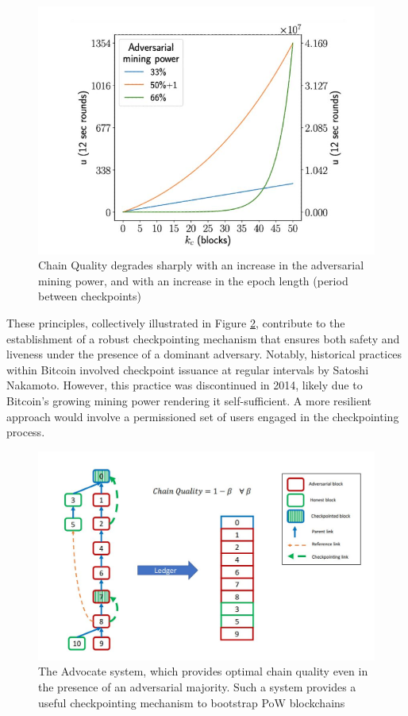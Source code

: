 \documentclass{report}
\begin{document}
\begin{figure}[h!]
	\centering
	\includegraphics[width=0.8\linewidth]{Fig/F5}
	\caption{Chain Quality degrades sharply with an increase in the adversarial mining power, and	with an increase in the epoch length (period between checkpoints)}
	\label{fig:f5}
\end{figure}
These principles, collectively illustrated in Figure \ref{fig:f6}, contribute to the establishment of a robust checkpointing mechanism that ensures both safety and liveness under the presence of a dominant adversary. Notably, historical practices within Bitcoin involved checkpoint issuance at regular intervals by Satoshi Nakamoto. However, this practice was discontinued in 2014, likely due to Bitcoin's growing mining power rendering it self-sufficient. A more resilient approach would involve a permissioned set of users engaged in the checkpointing process.\\
\begin{center}
	\begin{figure}
		\centering
		\includegraphics[width=0.8\linewidth]{Fig/F6}
		\caption{The Advocate system, which provides optimal chain quality even in the presence of an adversarial majority. Such a system provides a useful checkpointing mechanism to bootstrap PoW blockchains}
		\label{fig:f6}
	\end{figure}
\end{center}
\end{document}
